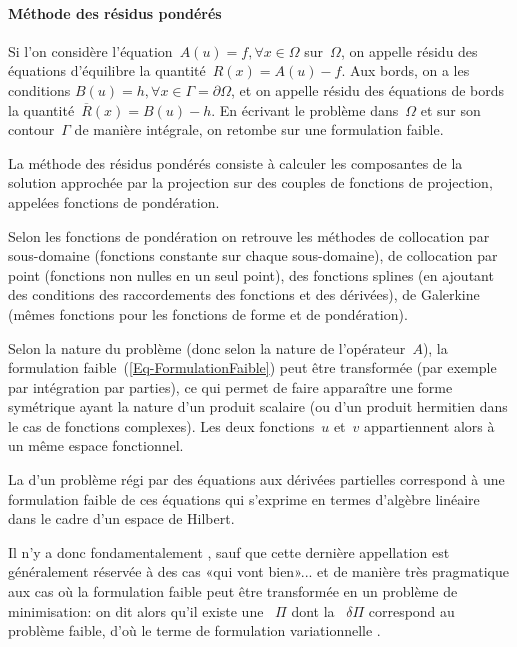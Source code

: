 \medskip
\paragraph{Méthode des résidus pondérés}\label{Sec-ResPond}
Si l'on considère l'équation~$A(u)=f, \forall x\in\Omega$ sur~$\Omega$, on appelle résidu des équations d'équilibre la quantité~$R(x)=A(u)-f$. Aux bords, on a les conditions $B(u)=h, \forall x\in\Gamma=\partial\Omega$, et on appelle résidu des équations de bords la quantité~$\overline{R}(x)=B(u)-h$. En écrivant le problème dans~$\Omega$ et sur son contour~$\Gamma$ de manière intégrale, on retombe sur une formulation faible.

La méthode des résidus pondérés consiste à calculer les composantes de la solution approchée par la projection sur des couples de fonctions de projection, appelées fonctions de pondération.

Selon les fonctions de pondération on retrouve les méthodes de collocation par sous-domaine (fonctions constante sur chaque sous-domaine), de collocation par point (fonctions non nulles en un seul point), des fonctions splines (en ajoutant des conditions des raccordements des fonctions et des dérivées), de Galerkine (mêmes fonctions pour les fonctions de forme et de pondération).

\medskip
Selon la nature du problème (donc selon la nature de l'opérateur~$A$), la formulation faible~(\ref{Eq-FormulationFaible}) peut être transformée (par exemple par intégration par parties), ce qui permet de faire apparaître une forme symétrique ayant la nature d'un produit scalaire (ou d'un produit hermitien dans le cas de fonctions complexes). Les deux fonctions~$u$ et~$v$ appartiennent alors à un même espace fonctionnel.

\medskip
La  d'un problème régi par des équations aux dérivées partielles correspond à une formulation faible de ces équations qui s'exprime en termes d'algèbre linéaire dans le cadre d'un espace de Hilbert.

Il n'y a donc fondamentalement , sauf que cette dernière appellation est généralement réservée à des cas «qui vont bien»... et de manière très pragmatique aux cas où la formulation faible peut être transformée en un problème de minimisation: on dit alors qu'il existe une ~$\Pi$ dont la ~$\delta\Pi$ correspond au problème faible, d'où le terme de formulation variationnelle .


